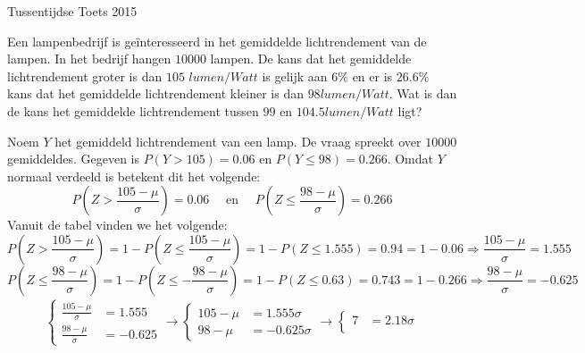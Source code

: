 \documentclass[main.tex]{subfiles}
\begin{document}
\begin{examenvraag}{Tussentijdse Toets 2015}
  \begin{ex-vraag}
    Een lampenbedrijf is ge\"interesseerd in het gemiddelde lichtrendement van de lampen.
    In het bedrijf hangen $10000$ lampen.
    De kans dat het gemiddelde lichtrendement groter is dan $105$ $lumen/Watt$ is gelijk aan $6\%$ en er is $26.6\%$ kans dat het gemiddelde lichtrendement kleiner is dan $98 lumen/Watt$.
    Wat is dan de kans het gemiddelde lichtrendement tussen $99$ en $104.5 lumen/Watt$ ligt?
  \end{ex-vraag}

  \begin{ex-antwoord}
    Noem $Y$ het gemiddeld lichtrendement van een lamp.
    De vraag spreekt over $10000$ gemiddeldes.
    Gegeven is $P(Y > 105) = 0.06$ en $P(Y \le 98) = 0.266$.
    Omdat $Y$ normaal verdeeld is betekent dit het volgende:
    \[ P\left(Z > \frac{105 - \mu}{\sigma}\right) = 0.06 \quad\text{ en }\quad P\left(Z \le \frac{98-\mu}{\sigma}\right) = 0.266\]
    Vanuit de tabel vinden we het volgende:
    \[
    P\left(Z > \frac{105 - \mu}{\sigma}\right)
    = 1 - P\left(Z \le \frac{105 - \mu}{\sigma}\right)
    = 1 - P(Z \le 1.555)
    = 0.94
    = 1-0.06
    \Rightarrow
    \frac{105-\mu}{\sigma}
    = 1.555
    \]
    \[ P\left(Z \le \frac{98-\mu}{\sigma}\right)
    = 1 - P\left(Z \le -\frac{98-\mu}{\sigma}\right)
    = 1 - P(Z \le 0.63)
    = 0.743
    = 1 - 0.266
    \Rightarrow
    \frac{98-\mu}{\sigma}
    = -0.625
    \]
    \begin{align*}
      \begin{cases}
        \frac{105-\mu}{\sigma}
        &= 1.555\\
        \frac{98-\mu}{\sigma}
        &= -0.625
      \end{cases}
      \longrightarrow
      \begin{cases}
        105-\mu
        &= 1.555\sigma\\
        98-\mu
        &= -0.625\sigma
      \end{cases}
      \longrightarrow
      \begin{cases}
        7
        &= 2.18\sigma\\

\end{cases}
\end{align*}
\end{ex-antwoord}
\end{examenvraag}
\end{document}
